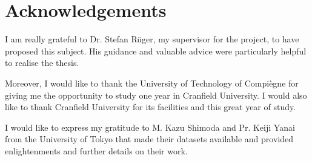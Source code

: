 \chapter{Acknowledgements}

I am really grateful to Dr. Stefan Rüger, my supervisor for the project, to have proposed this subject. His guidance and valuable advice were particularly helpful to realise the thesis.

Moreover, I would like to thank the University of Technology of Compiègne for giving me the opportunity to study one year in Cranfield University. I would also like to thank Cranfield University for its facilities and this great year of study.

I would like to express my gratitude to M. Kazu Shimoda and Pr. Keiji Yanai from the University of Tokyo that made their datasets available and provided enlightenments and further details on their work.